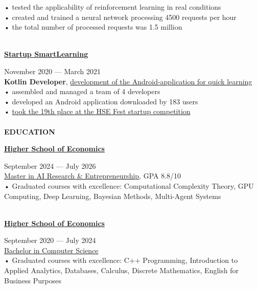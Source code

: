 \documentclass{article}
\begin{document}
\begin{vwcol}[widths={0.8,0.2},
 sep=.8cm, justify=flush,rule=0pt,indent=1em]
• tested the applicability of reinforcement learning in real conditions\\
• created and trained a neural network processing 4500 requests per hour\\
• the total number of processed requests was 1.5 million\\
\\
\begin{Large}
\href{https://www.canva.com/design/DAEaT9nPC7Y/y7_r2BzUEiUiFKW36oP-Pw/view?utm_content=DAEaT9nPC7Y&utm_campaign=designshare&utm_medium=link&utm_source=publishsharelink}{\textbf{Startup SmartLearning}}
\end{Large}
\hspace{127pt}November 2020 — March 2021\\
\textbf{Kotlin Developer}, \href{https://gitlab.com/peganov.nik/smartlearning}{development of the Android-application for quick learning}\\
• assembled and managed a team of 4 developers\\
• developed an Android application downloaded by 183 users\\
• \href{https://fest.hse.ru/top1002021}{took the 19th place at the HSE Fest startup competition}\\
\\
\noindent\textcolor[rgb]{0.1255,0.2902,0.7843}{\textbf{\Large{EDUCATION}}}\\
\begin{Large}
\textbf{\href{https://hse.ru/}{Higher School of Economics}}
\end{Large}
\hspace{92pt}September 2024 — July 2026\\
\href{https://www.hse.ru/ma/ipii/}{Master in AI Research \& Entrepreneurship}, GPA 8.8/10\\
• Graduated courses with excellence: Computational Complexity Theory, GPU Computing, Deep Learning, Bayesian Methods, Multi-Agent Systems\\
\\
\begin{Large}
\textbf{\href{https://hse.ru/}{Higher School of Economics}}
\end{Large}
\hspace{100pt}September 2020 — July 2024\\
\href{https://cs.hse.ru/}{Bachelor in Computer Science}\\
• Graduated courses with excellence: C++ Programming, Introduction to Applied Analytics, Databases, Calculus, Discrete Mathematics, English for Business Purposes\\

\end{vwcol}
\end{document}

